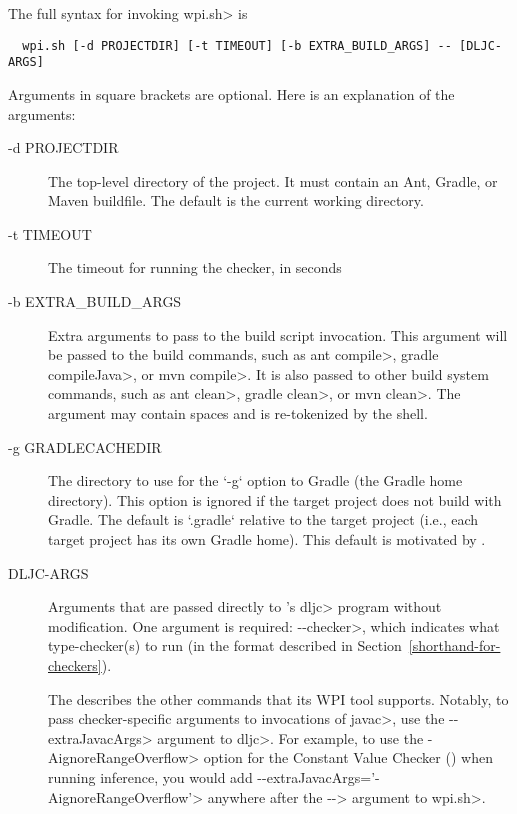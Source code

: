The full syntax for invoking \<wpi.sh> is

\begin{Verbatim}
  wpi.sh [-d PROJECTDIR] [-t TIMEOUT] [-b EXTRA_BUILD_ARGS] -- [DLJC-ARGS]
\end{Verbatim}

Arguments in square brackets are optional.
Here is an explanation of the arguments:

\begin{description}
\item[-d PROJECTDIR]
  The top-level directory of the project.  It must contain an Ant, Gradle,
  or Maven buildfile. The default is the current working directory.

\item[-t TIMEOUT]
  The timeout for running the checker, in seconds

\item[-b EXTRA\_BUILD\_ARGS]
  Extra arguments to pass to the build script invocation. This argument
  will be passed to the build commands, such as
  \<ant compile>, \<gradle compileJava>, or \<mvn compile>.
  It is also passed to other build system commands, such as
  \<ant clean>, \<gradle clean>, or \<mvn clean>.
  The argument may contain spaces and is re-tokenized by the shell.

\item[-g GRADLECACHEDIR]
  The directory to use for the `-g` option to Gradle (the Gradle home
  directory). This option is ignored if the target project does not
  build with Gradle. The default is `.gradle` relative to the target
  project (i.e., each target project has its own Gradle home). This default
  is motivated by
  .

\label{DLJC-ARGS}
\item[DLJC-ARGS]
  Arguments that are passed directly to
  's
  \<dljc> program without
  modification.  One argument is required: \<-\relax-checker>, which indicates
  what type-checker(s) to run (in the format described in Section~\ref{shorthand-for-checkers}).

  The 
  describes the other commands that its WPI tool supports. Notably, to pass checker-specific
  arguments to invocations of \<javac>,
  use the \<-\relax-extraJavacArgs> argument to \<dljc>. For example, to use the \<-AignoreRangeOverflow>
  option for the Constant Value Checker () when running
  inference, you would add \<-\relax-extraJavacArgs='-AignoreRangeOverflow'> anywhere after the \<-\relax->
  argument to \<wpi.sh>.
\end{description}

